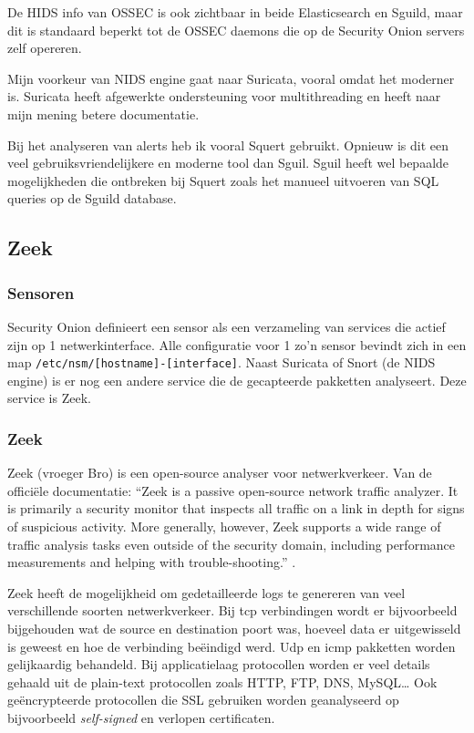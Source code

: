 \documentclass[a4paper, 12pt]{report}
\begin{document}
De HIDS info van OSSEC is ook zichtbaar in beide Elasticsearch en Sguild, maar dit is standaard beperkt tot de OSSEC daemons die op de Security Onion servers zelf opereren.

Mijn voorkeur van NIDS engine gaat naar Suricata, vooral omdat het moderner is.
Suricata heeft afgewerkte ondersteuning voor multithreading en heeft naar mijn mening betere documentatie.

Bij het analyseren van alerts heb ik vooral Squert gebruikt.
Opnieuw is dit een veel gebruiksvriendelijkere en moderne tool dan Sguil.
Sguil heeft wel bepaalde mogelijkheden die ontbreken bij Squert zoals het manueel uitvoeren van SQL queries op de Sguild database.

\subsection{Zeek}
\subsubsection{Sensoren}
Security Onion definieert een sensor als een verzameling van services die actief zijn op 1 netwerkinterface.
Alle configuratie voor 1 zo'n sensor bevindt zich in een map \lstinline|/etc/nsm/[hostname]-[interface]|.
Naast Suricata of Snort (de NIDS engine) is er nog een andere service die de gecapteerde pakketten analyseert.
Deze service is Zeek.

\subsubsection{Zeek}
Zeek (vroeger Bro) is een open-source analyser voor netwerkverkeer.
Van de officiële documentatie:
``Zeek is a passive open-source network traffic analyzer.
It is primarily a security monitor that inspects all traffic on a link in depth for signs of suspicious activity.
More generally, however, Zeek supports a wide range of traffic analysis tasks even outside of the security domain, including performance measurements and helping with trouble-shooting.'' \autocite{zeek:docs}.

Zeek heeft de mogelijkheid om gedetailleerde logs te genereren van veel verschillende soorten netwerkverkeer.
Bij tcp verbindingen wordt er bijvoorbeeld bijgehouden wat de source en destination poort was, hoeveel data er uitgewisseld is geweest en hoe de verbinding beëindigd werd.
Udp en icmp pakketten worden gelijkaardig behandeld.
Bij applicatielaag protocollen worden er veel details gehaald uit de plain-text protocollen zoals HTTP, FTP, DNS, MySQL\dots
Ook geëncrypteerde protocollen die SSL gebruiken worden geanalyseerd op bijvoorbeeld \emph{self-signed} en verlopen certificaten.
\end{document}
